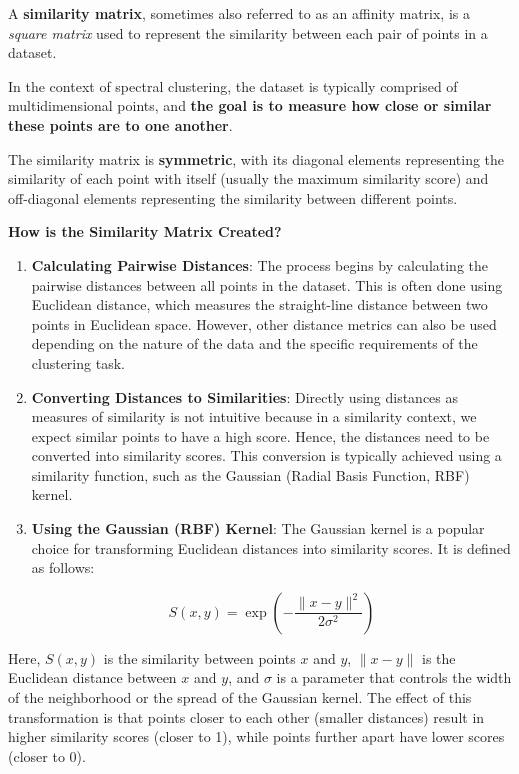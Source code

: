 \documentclass[11pt]{article}
\begin{document}
A \textbf{similarity matrix}, sometimes also referred to as an affinity
matrix, is a \emph{square matrix} used to represent the similarity
between each pair of points in a dataset.

In the context of spectral clustering, the dataset is typically
comprised of multidimensional points, and \textbf{the goal is to measure
how close or similar these points are to one another}.

The similarity matrix is \textbf{symmetric}, with its diagonal elements
representing the similarity of each point with itself (usually the
maximum similarity score) and off-diagonal elements representing the
similarity between different points.

    \textbf{How is the Similarity Matrix Created?}

\begin{enumerate}
\def\labelenumi{\arabic{enumi}.}
\item
  \textbf{Calculating Pairwise Distances}: The process begins by
  calculating the pairwise distances between all points in the dataset.
  This is often done using Euclidean distance, which measures the
  straight-line distance between two points in Euclidean space. However,
  other distance metrics can also be used depending on the nature of the
  data and the specific requirements of the clustering task.
\item
  \textbf{Converting Distances to Similarities}: Directly using
  distances as measures of similarity is not intuitive because in a
  similarity context, we expect similar points to have a high score.
  Hence, the distances need to be converted into similarity scores. This
  conversion is typically achieved using a similarity function, such as
  the Gaussian (Radial Basis Function, RBF) kernel.
\item
  \textbf{Using the Gaussian (RBF) Kernel}: The Gaussian kernel is a
  popular choice for transforming Euclidean distances into similarity
  scores. It is defined as follows:

  \[ S(x, y) = \exp\left(-\frac{\|x - y\|^2}{2\sigma^2}\right) \]
\end{enumerate}

    Here, \(S(x, y)\) is the similarity between points \(x\) and \(y\),
\(\|x - y\|\) is the Euclidean distance between \(x\) and \(y\), and
\(\sigma\) is a parameter that controls the width of the neighborhood or
the spread of the Gaussian kernel. The effect of this transformation is
that points closer to each other (smaller distances) result in higher
similarity scores (closer to 1), while points further apart have lower
scores (closer to 0).
\end{document}
